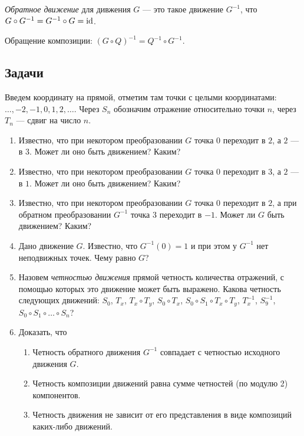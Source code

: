 \textit{Обратное движение} для дивжения $G$ --- это такое движение $G^{-1}$, что $G\circ G^{-1}=G^{-1}\circ G=\mathrm{id}$.

Обращение композиции: $(G\circ Q)^{-1} = Q^{-1}\circ G^{-1}$.

\subsection*{Задачи}

Введем координату на прямой, отметим там точки с целыми координатами: $\dots,-2,-1,0,1,2,\dots$. Через $S_n$ обозначим отражение относительно точки $n$, через $T_n$ --- сдвиг на число $n$.
\begin{enumerate}
\item Известно, что при некотором преобразовании $G$ точка $0$ переходит в $2$, а $2$ --- в $3$. Может ли оно быть движением? Каким?
\item Известно, что при некотором преобразовании $G$ точка $0$ переходит в $3$, а $2$ --- в $1$. Может ли оно быть движением? Каким?
\item Известно, что при некотором преобразовании $G$ точка $0$ переходит в $2$, а при обратном преобразовании $G^{-1}$ точка $3$ переходит в $-1$. Может ли $G$ быть движением? Каким?
\item Дано движение $G$. Известно, что $G^{-1}(0)=1$ и при этом у $G^{-1}$ нет неподвижных точек. Чему равно $G$?
\item Назовем \textit{четностью движения} прямой четность количества отражений, с помощью которых это движение может быть выражено. Какова четность следующих движений: $S_0$, $T_x$, $T_x\circ T_y$, $S_0\circ T_x$, $S_0\circ S_1\circ T_x\circ T_y$, $T_x^{-1}$, $S_9^{-1}$, $S_0\circ S_1\circ\dots\circ S_n$?
\item Доказать, что
\begin{enumerate}
\item Четность обратного движения  $G^{-1}$ совпадает с четностью исходного движения $G$.
\item Четность композиции движений равна сумме четностей (по модулю 2) компонентов.
\item Четность движения не зависит от его представления в виде композиций каких-либо движений.
\end{enumerate}
\end{enumerate}

